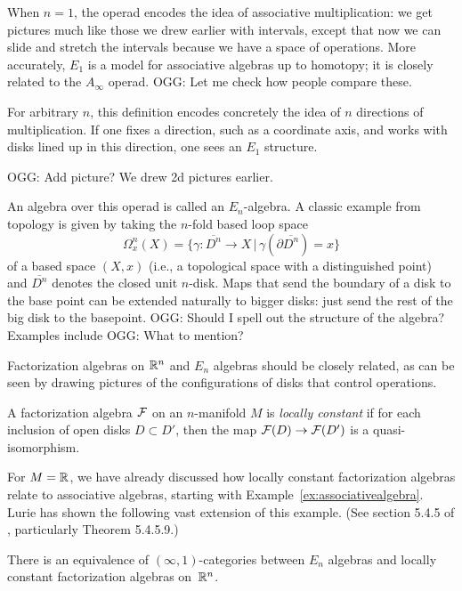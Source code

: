 \documentclass[11pt]{amsart}
\def\mcol{\, | \,}
\def\owen#1{{\textcolor{green!65!black}{OGG: {#1}}}}
\begin{document}
When $n = 1$, the operad encodes the idea of associative multiplication:
we get pictures much like those we drew earlier with intervals, 
except that now we can slide and stretch the intervals because we have a space of operations.
More accurately, $E_1$ is a model for associative algebras up to homotopy; 
it is closely related to the $A_\infty$ operad. \owen{Let me check how people compare these.}

For arbitrary $n$, this definition encodes concretely the idea of $n$ directions of multiplication.
If one fixes a direction, such as a coordinate axis, and works with disks lined up in this direction,
one sees an $E_1$ structure.

\owen{Add picture? We drew 2d pictures earlier.}

An algebra over this operad is called an $E_n$-algebra.
A classic example from topology is given by taking the $n$-fold based loop space
\[
\Omega^n_x(X) = \{ \gamma: \overline{D^n} \to X \mcol \gamma(\partial \overline{D^n}) = x\}
\]
of a based space $(X,x)$ (i.e., a topological space with a distinguished point) and $\overline{D^n}$ denotes the closed unit $n$-disk.
Maps that send the boundary of a disk to the base point can be extended naturally to bigger disks: just send the rest of the big disk to the basepoint.
\owen{Should I spell out the structure of the algebra?}
Examples include \owen{What to mention?}

Factorization algebras on $\mathbb R^n$ and $E_n$ algebras should be closely related,
as can be seen by drawing pictures of the configurations of disks that control operations.

\begin{dfn}
A factorization algebra $\mathcal F$ on an $n$-manifold $M$ is \emph{locally constant} if for each inclusion of open disks $D \subset D'$, then the map $\mathcal F(D) \to \mathcal F(D')$ is a quasi-isomorphism.
\end{dfn}

For $M = \mathbb R$, we have already discussed how locally constant factorization algebras relate to associative algebras, starting with Example~\ref{ex:associativealgebra}.
Lurie has shown the following vast extension of this example. (See section 5.4.5 of \cite{LurieHA}, particularly Theorem 5.4.5.9.)

\begin{thm}\label{thm:locisen}
There is an equivalence of $(\infty,1)$-categories between $E_n$ algebras and locally constant factorization algebras on~$\mathbb R^n$.  
\end{thm}  
\end{document}
